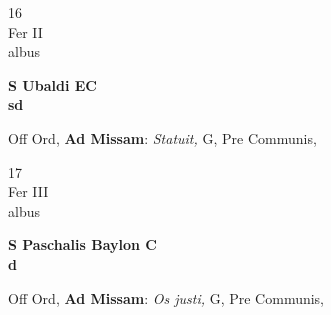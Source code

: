 \documentclass[10pt, openany]{book}
\begin{document}
        \begin{center}
            \begin{minipage}{3.5in}
                \vspace{2em}
                \begin{minipage}{0.5in}
                    {\Huge 16} \\
                    {\normalsize Fer II} \\
                    {\normalsize albus}
                \end{minipage}
                \begin{minipage}{3.0in}
                    \textbf{ \large S Ubaldi EC \\
                    \textnormal{\normalsize sd}} \\ 
                \end{minipage}
                \begin{justify}Off Ord, \textbf{Ad Missam}: \textit{Statuit,} G, Pre Communis,   
                \end{justify}
            \end{minipage}
        \end{center}
    
        \begin{center}
            \begin{minipage}{3.5in}
                \vspace{2em}
                \begin{minipage}{0.5in}
                    {\Huge 17} \\
                    {\normalsize Fer III} \\
                    {\normalsize albus}
                \end{minipage}
                \begin{minipage}{3.0in}
                    \textbf{ \large S Paschalis Baylon C \\
                    \textnormal{\normalsize d}} \\ 
                \end{minipage}
                \begin{justify}Off Ord, \textbf{Ad Missam}: \textit{Os justi,} G, Pre Communis,   
                \end{justify}
            \end{minipage}
        \end{center}
    
\end{document}
